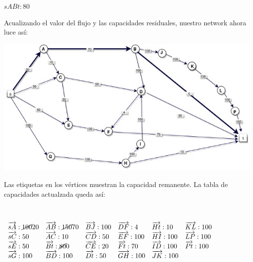 \documentclass[10pt,a4paper]{article}
\begin{document}
\begin{center}
$sABt: 80$
\end{center}

Acualizando el valor del flujo y las capacidades residuales, nuestro network ahora luce así:

\begin{center}

    \begin{adjustbox}{max size={\textwidth}{\textheight}}
        \includegraphics{definitions/EK2.jpg}
        \end{adjustbox}
    
\end{center}

Las etiquetas en los vértices muestran la capacidad remanente. La tabla de capacidades actualzada queda así:

 

\begin{center}
$\begin{array}{llllll} \overrightarrow{sA}: \cancel{100}20& \overrightarrow{AB}: \cancel{150} 70&\overrightarrow{BJ}: 100&\overrightarrow{DF}: 4&\overrightarrow{Ht}: 10&\overrightarrow{KL}: 100\\ \overrightarrow{sC}: 50& \overrightarrow{AC}: 10&\overrightarrow{CD}: 50&\overrightarrow{EF}: 100&\overrightarrow{HI}: 100&\overrightarrow{LP}: 100\\ \overrightarrow{sE}: 50& \overrightarrow{Bt}: \cancel{80} 0&\overrightarrow{CE}: 20&\overrightarrow{Ft}: 70&\overrightarrow{ID}: 100&\overrightarrow{Pt}: 100\\ \overrightarrow{sG}: 100& \overrightarrow{BD}: 100&\overrightarrow{Dt}: 50&\overrightarrow{GH}: 100&\overrightarrow{JK}: 100&\\ \end{array}$
\end{center}
\end{document}
